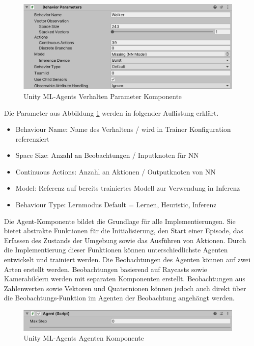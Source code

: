 \begin{figure}[H]
  \centering  
  \includegraphics[scale=0.5]{img/komponente_behavior_parameters}
  \caption{Unity ML-Agents Verhalten Parameter Komponente}
  \label{fig:komponente_behavior_parameters}
\end{figure}

Die Parameter aus Abbildung \ref{fig:komponente_behavior_parameters} werden in folgender Auflistung erklärt.

\begin{itemize}
  \item Behaviour Name: Name des Verhaltens / wird in Trainer Konfiguration referenziert
  \item Space Size: Anzahl an Beobachtungen / Inputknoten für NN
  \item Continuous Actions: Anzahl an Aktionen / Outputknoten von NN
  \item Model: Referenz auf bereits trainiertes Modell zur Verwendung in Inferenz
  \item Behaviour Type: Lernmodus Default = Lernen, Heuristic, Inferenz
\end{itemize}

Die Agent-Komponente bildet die Grundlage für alle Implementierungen. Sie bietet abstrakte Funktionen für die Initialisierung, den Start einer Episode, das Erfassen des Zustands der Umgebung sowie das Ausführen von Aktionen. Durch die Implementierung dieser Funktionen können unterschiedlichste Agenten entwickelt und trainiert werden. Die Beobachtungen des Agenten können auf zwei Arten erstellt werden. Beobachtungen basierend auf Raycasts sowie Kamerabildern werden mit separaten Komponenten erstellt. Beobachtungen aus Zahlenwerten sowie Vektoren und Quaternionen können jedoch auch direkt über die Beobachtungs-Funktion im Agenten der Beobachtung angehängt werden.

\begin{figure}[H]
  \centering
  \includegraphics[scale=0.5]{img/komponente_agent}
  \caption{Unity ML-Agents Agenten Komponente}
  \label{fig:komponente_agent}
\end{figure}

